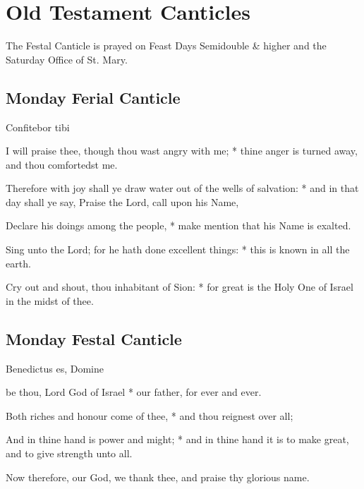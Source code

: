 \section{Old Testament Canticles}\label{OT}
\begin{secrubric}
    The Festal Canticle is prayed on Feast Days Semidouble \& higher and the Saturday Office of St. Mary.
\end{secrubric}

\begin{multicols}{2}
\subsection{Monday Ferial Canticle}

\begin{inhead}
Confitebor tibi
\end{inhead}

 I will praise thee, though thou wast angry with me; * thine anger is turned away, and thou comfortedst me.\par
{}
Therefore with joy shall ye draw water out of the wells of salvation: * and in that day shall ye say, Praise the Lord, call upon his Name,\par
Declare his doings among the people, * make mention that his Name is exalted.\par
Sing unto the Lord; for he hath done excellent things: * this is known in all the earth.\par
Cry out and shout, thou inhabitant of Sion: * for great is the Holy One of Israel in the midst of thee.

\subsection{Monday Festal Canticle}

\begin{inhead}
Benedictus es, Domine
\end{inhead}

 be thou, Lord God of Israel * our father, for ever and ever.\par
{}
Both riches and honour come of thee, * and thou reignest over all;\par
And in thine hand is power and might; * and in thine hand it is to make great, and to give strength unto all.\par
Now therefore, our God, we thank thee, and praise thy glorious name.


\end{multicols}
